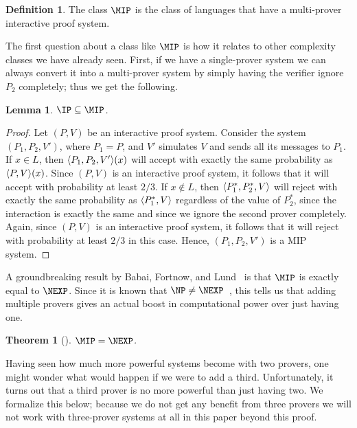 \documentclass[english,12pt]{reedthesis}
\theoremstyle{plain}
\newtheorem{thm}{Theorem}[section]
\newtheorem{lemma}[lemma]{Lemma}
\theoremstyle{definition}
\newtheorem{defn}[defn]{Definition}
\theoremstyle{remark}
\DeclarePairedDelimiter{\ang}{\langle}{\rangle}
\begin{document}
\begin{defn}\label{def:mip}
  The class $\MIP$ is the class of languages that have a multi-prover
  interactive proof system.
\end{defn}

The first question about a class like $\MIP$ is how it relates to other
complexity classes we have already seen. First, if we have a single-prover
system we can always convert it into a multi-prover system by simply having the
verifier ignore $P_{2}$ completely; thus we get the following.

\begin{lemma}\label{lem:ip-in-mip}
  $\IP \subseteq \MIP$.
\end{lemma}

\begin{proof}
  Let $(P, V)$ be an interactive proof system. Consider the system
  $(P_{1}, P_{2}, V')$, where $P_{1} = P$, and $V'$ simulates $V$ and sends all
  its messages to $P_{1}$. If $x \in L$, then $\ang{P_{1}, P_{2}, V'}(x)$ will
  accept with exactly the same probability as $\ang{P, V}(x)$. Since $(P, V)$ is
  an interactive proof system, it follows that it will accept with probability
  at least $2/3$. If $x \notin L$, then $\ang{P_{1}^{*}, P_{2}^{*}, V}$ will reject
  with exactly the same probability as $\ang{P_{1}^{*}, V}$ regardless of the
  value of $P_{2}^{*}$, since the interaction is exactly the same and since we
  ignore the second prover completely. Again, since $(P, V)$ is an interactive
  proof system, it follows that it will reject with probability at least $2/3$
  in this case. Hence, $(P_{1}, P_{2}, V')$ is a MIP system.
\end{proof}

A groundbreaking result by Babai, Fortnow, and Lund~\cite{BFL90} is that $\MIP$
is exactly equal to $\NEXP$. Since it is known that $\NP \ne \NEXP$~\cite{Cook73},
this tells us that adding multiple provers gives an actual boost in
computational power over just having one.

\begin{thm}[{\cite{BFL90}}]\label{thm:mip-is-nexp}
  $\MIP = \NEXP$.
\end{thm}

Having seen how much more powerful systems become with two provers, one might
wonder what would happen if we were to add a third. Unfortunately, it turns out
that a third prover is no more powerful than just having two. We formalize this
below; because we do not get any benefit from three provers we will not work
with three-prover systems at all in this paper beyond this proof.
\end{document}

